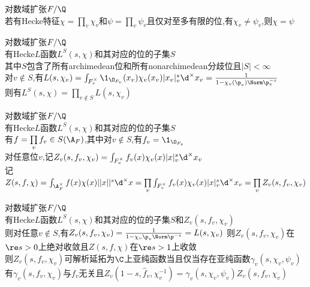 \begin{dingli}
对数域扩张$F/\Q$\\
若有Hecke特征$\chi=\prod\limits_{v}\chi_{v}$和$\psi=\prod\limits_{v}\psi_{v}$且仅对至多有限的位,有$\chi_{v}\neq \psi_{v}$,则$\chi=\psi$
\end{dingli}

\begin{dingli}
对数域扩张$F/\Q$\\
有Hecke$L$函数$L^{S}(s,\chi)$和其对应的位的子集$S$\\
其中$S$包含了所有archimedean位和所有nonarchimedean分歧位且$|S|<\infty$\\
对$v\notin S$,有$L(s,\chi_{v})=\int_{F_{v}^{\times}}\1_{\O_{F_{v}}}(x_v)\chi_{v}(x_v)|x_v|_{v}^{s}\d^{\times}x_v=\frac{1}{1-\chi_{v}(\p_{v})\Norm\p_{v}^{-s}}$\\
则有$L^{S}(s,\chi)=\prod\limits_{v\notin S}L(s,\chi_{v})$
\end{dingli}

\begin{dingyi}
对数域扩张$F/\Q$\\
有Hecke$L$函数$L^{S}(s,\chi)$和其对应的位的子集$S$\\
有$f=\prod\limits_{v}f_v\in S(\A_{F})$,其中对$v\notin S$,有$f_v=\1_{\O_{F_{v}}}$\\
对任意位$v$,记$Z_{v}(s,f_{v},\chi_{v})=\int_{F_{v}^{\times}}f_{v}(x)\chi_{v}(x)|x|_{v}^{s}\d^{\times}x_{v}$\\
记$Z(s,f,\chi)=\int_{\A_{F}^{\times}}f(x)\chi(x)||x||^{s}\d^{\times}x=\prod\limits_{v}\int_{F_{v}^{\times}}f_{v}(x)\chi_{v}(x)|x|_{v}^{s}\d^{\times}x_{v}=\prod\limits_{v}Z_{v}(s,f_{v},\chi_{v})$
\end{dingyi}

\begin{dingli}
对数域扩张$F/\Q$\\
有Hecke$L$函数$L^{S}(s,\chi)$和其对应的位的子集$S$和$Z_{v}(s,f_{v},\chi_{v})$\\
则对任意$v\notin S$,有$Z_{v}(s,f_{v},\chi_{v})=\frac{1}{1-\chi_{v}\p_{v}\Norm\p^{-s}}=L(s,\chi_{v})$
则$Z_{v}(s,f_{v},\chi_{v})$在$\re s>0$上绝对收敛且$Z(s,f,\chi)$在$\re s>1$上收敛\\
则$Z_{v}(s,f_{v},\chi_{v})$可解析延拓为$\C$上亚纯函数当且仅当存在亚纯函数$\gamma_{v}(s,\chi_{v},\psi_{v})$\\
有$\gamma_{v}(s,f_{v},\chi_{v})$与$f_{v}$无关且$Z_{v}(1-s,\widehat{f}_{v},\chi_{v}^{-1})=\gamma_{v}(s,\chi_{v},\psi_{v})Z_{v}(s,f_{v},\chi_{v})$
\end{dingli}

